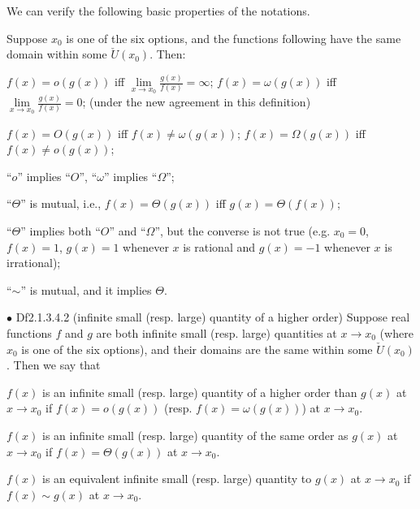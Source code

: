 \documentclass{article}
\begin{document}
\begin{Rmk}{}
    We can verify the following basic properties of the notations.\\
    \textcolor{Th}{Suppose $x_0$ is one of the six options, and the functions following have the same domain within some $\check{U}(x_0)$. Then:
    \begin{compactenum}
        \item $f(x) = o(g(x))$ iff $\lim\limits_{x\to x_0} \frac{g(x)}{f(x)} = \infty$; $f(x) = \omega(g(x))$ iff $\lim\limits_{x\to x_0} \frac{g(x)}{f(x)} = 0$; (under the new agreement in this definition)
        \item $f(x) = O(g(x))$ iff $f(x) \neq \omega(g(x))$; $f(x) = \Omega(g(x))$ iff $f(x) \neq o(g(x))$;
        \item ``$o$'' implies ``$O$'', ``$\omega$'' implies ``$\Omega$'';
        \item ``$\Theta$'' is mutual, i.e., $f(x) = \Theta(g(x))$ iff $g(x) = \Theta(f(x))$;
        \item ``$\Theta$'' implies both ``$O$'' and ``$\Omega$'', but the converse is not true (e.g. $x_0 = 0$, $f(x) = 1$, $g(x) = 1$ whenever $x$ is rational and $g(x) = -1$ whenever $x$ is irrational);
        \item ``$\sim$'' is mutual, and it implies $\Theta$.
    \end{compactenum}
    }
\end{Rmk}

\begin{Df}{$\bullet$ Df2.1.3.4.2 (infinite small (resp. large) quantity of a higher order)}
    Suppose real functions $f$ and $g$ are both infinite small (resp. large) quantities at $x\rightarrow x_0$ (where $x_0$ is one of the six options), and their domains are the same within some $\check{U}(x_0)$. Then we say that
    \begin{compactenum}
        \item $f(x)$ is an infinite small (resp. large) quantity of a higher order than $g(x)$ at $x\rightarrow x_0$ if $f(x) = o(g(x))$ (resp. $f(x) = \omega(g(x))$) at $x\rightarrow x_0$.
        \item $f(x)$ is an infinite small (resp. large) quantity of the same order as $g(x)$ at $x\rightarrow x_0$ if $f(x) = \Theta(g(x))$ at $x\rightarrow x_0$.
        \item $f(x)$ is an equivalent infinite small (resp. large) quantity to $g(x)$ at $x\rightarrow x_0$ if $f(x) \sim g(x)$ at $x\rightarrow x_0$.
    \end{compactenum}
\end{Df}
\end{document}
